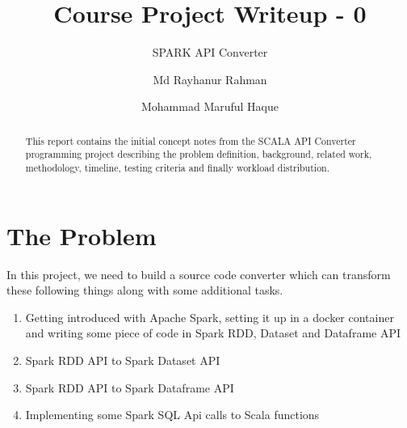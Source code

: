 \documentclass[sigplan, review]{acmart}\settopmatter{printfolios=true,printccs=false,printacmref=false}
\begin{document}
\title[Course Project Writeup - 0]{Course Project Writeup - 0}         
\titlenote{} 
\subtitle{SPARK API Converter}                    

\author{Md Rayhanur Rahman}

\author{Mohammad Maruful Haque}


\begin{abstract}
This report contains the initial concept notes from the SCALA API Converter programming project describing the problem definition, background, related work, methodology, timeline, testing criteria and finally workload distribution.
\end{abstract}

\maketitle


\section{The Problem}
In this project, we need to build a source code converter which can transform these following things along with some additional tasks. 
\begin{enumerate}
	\item Getting introduced with Apache Spark, setting it up in a docker container and writing some piece of code in Spark RDD, Dataset and Dataframe API
	\item Spark RDD API to Spark Dataset API
	\item Spark RDD API to Spark Dataframe API
	\item Implementing some Spark SQL Api calls to Scala functions
\end{enumerate}
\end{document}
